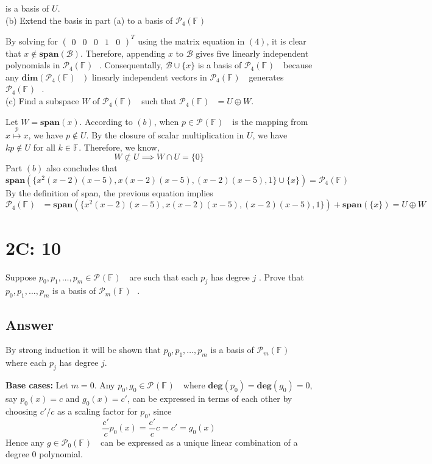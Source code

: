 \documentclass[
	12pt, %
]{fphw}
\newcommand\0{\mathbf{0}}
\newcommand\set[1]{\{#1\}}
\newcommand\F[1]{\text{$\mathbb{F}^{#1}$}}
\newcommand\ls[2]{\text{$#1_1, \ldots, #1_{#2}$}}
\newcommand\poly[1]{\text{$\mathcal{P}_{#1}(\F{})$ }}
\newcommand\spann[1]{\mathbf{span}(#1)}
\renewcommand\deg[1]{\textbf{deg$(#1)$}}
\renewcommand\dim[1]{\mathbf{dim}(#1)}
\begin{document}
is a basis of $U$.\\

\noindent
(b) Extend the basis in part (a) to a basis of $\poly{4}$

By solving for $\begin{pmatrix}0 & 0 & 0 & 1 & 0 \end{pmatrix}^T$ using the matrix equation in $(4)$, it is clear that $x \not \in \spann{\mathcal{B}}$. Therefore, appending $x$ to $\mathcal{B}$ gives five linearly independent polynomials in $\poly{4}$. Consequentally, $\mathcal B \cup \set{x}$ is a basis of $\poly{4}$ because any $\dim{\poly{4}}$ linearly independent vectors in $\poly{4}$ generates $\poly{4}$.\\


\noindent
(c) Find a subspace $W$ of $\poly{4}$ such that $\poly{4} = U \oplus W$.

Let $W = \spann{x}$. According to $(b)$, when $p \in \poly{}$ is the mapping from $x\overset{p}{\mapsto}x$, we have $p \not \in U$. By the closure of scalar multiplication in $U$, we have $kp \not \in U$ for all $k \in \F{}$. Therefore, we know,
$$W \not \subset U \implies W \cap U = \set{0}$$
Part $(b)$ also concludes that 
$$\spann{\set{x^2(x-2)(x-5), x(x-2)(x-5), (x-2)(x-5), 1} \cup  \set{x}} = \poly{4}$$
By the definition of span, the previous equation implies
$$
\poly{4} = \spann{\set{x^2(x-2)(x-5), x(x-2)(x-5), (x-2)(x-5), 1}} + \spann{\set{x}} = U \oplus W
$$

\newpage
\section*{2C: 10}

\begin{problem}
Suppose $p_0, \ls{p}{m} \in \poly{}$ are such that each $p_j$ has degree $j$ .
Prove that $p_0, \ls{p}{m}$ is a basis of $\poly{m}$.
\end{problem}


\subsection*{Answer} By strong induction it will be shown that $p_0, \ls{p}{m}$  is a basis of $\poly{m}$ where each $p_j$ has degree $j$.

\textbf{Base cases:} Let $m = 0$. Any $p_0, g_0 \in \poly{}$ where $\deg{p_0} = \deg{g_0} = 0$, say $p_0(x) = c$ and $g_0(x) = c'$, can be expressed in terms of each other by choosing $c'/c$ as a scaling factor for $p_0$, since
$$
\frac{c'}{c} p_0(x) = \frac{c'}{c} c = c' = g_0(x)
$$
Hence any $g \in \poly{0}$ can be expressed as a unique linear combination of a degree 0 polynomial.
\end{document}
